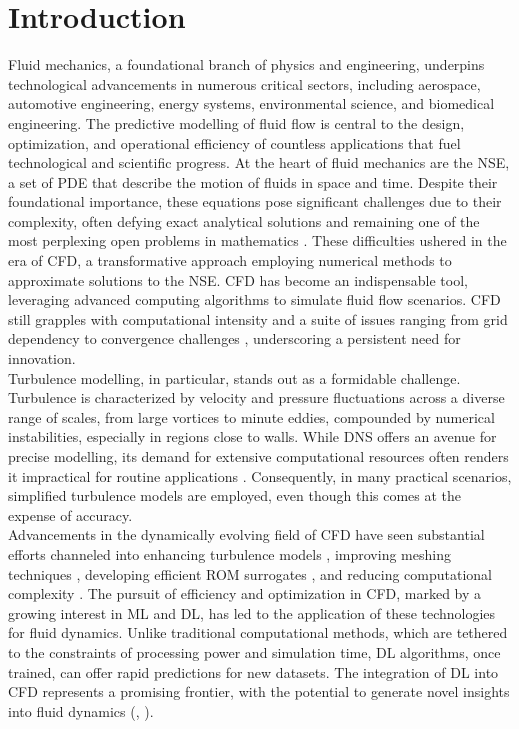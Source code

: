 \chapter{Introduction}
\label{chap:Intro}
Fluid mechanics, a foundational branch of physics and engineering, underpins technological advancements in numerous critical sectors, including aerospace, automotive engineering, energy systems, environmental science, and biomedical engineering. The predictive modelling of fluid flow is central to the design, optimization, and operational efficiency of countless applications that fuel technological and scientific progress. At the heart of fluid mechanics are the \gls{NSE}, a set of \gls{PDE} that describe the motion of fluids in space and time. Despite their foundational importance, these equations pose significant challenges due to their complexity, often defying exact analytical solutions and remaining one of the most perplexing open problems in mathematics \cite{fefferman2006existence}. These difficulties ushered in the era of \gls{CFD}, a transformative approach employing numerical methods to approximate solutions to the NSE. CFD has become an indispensable tool, leveraging advanced computing algorithms to simulate fluid flow scenarios. CFD still grapples with computational intensity and a suite of issues ranging from grid dependency to convergence challenges  \cite{ferziger2002computational}, underscoring a persistent need for innovation.\\
Turbulence modelling, in particular, stands out as a formidable challenge. Turbulence is characterized by velocity and pressure fluctuations across a diverse range of scales, from large vortices to minute eddies, compounded by numerical instabilities, especially in regions close to walls. While \gls{DNS} offers an avenue for precise modelling, its demand for extensive computational resources often renders it impractical for routine applications  \cite{moin1998direct}. Consequently, in many practical scenarios, simplified turbulence models are employed, even though this comes at the expense of accuracy.\\
Advancements in the dynamically evolving field of CFD have seen substantial efforts channeled into enhancing turbulence models \cite{pope2000turbulent}, improving meshing techniques \cite{thompson1998automatic}, developing efficient \gls{ROM} surrogates \cite{benner2015survey}, and reducing computational complexity \cite{schmid2010dynamic}. The pursuit of efficiency and optimization in CFD, marked by a growing interest in \gls{ML} and \gls{DL}, has led to the application of these technologies for fluid dynamics. Unlike traditional computational methods, which are tethered to the constraints of processing power and simulation time, DL algorithms, once trained, can offer rapid predictions for new datasets. The integration of DL into CFD represents a promising frontier, with the potential to generate novel insights into fluid dynamics (\cite{kutz2017deep}, \cite{raissi2019physics}).\\
